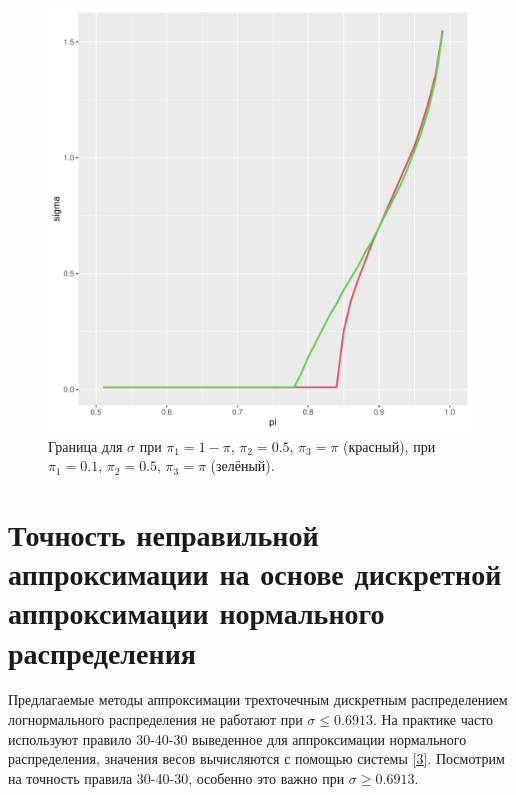 \documentclass[specialist, substylefile = spbu.rtx,
subf,href,colorlinks=true, 12pt]{disser}
\begin{document}
	\begin{figure}[!hhh]
		\begin{center}
			\begin{minipage}[h]{0.95\linewidth}
				\includegraphics[width=1\linewidth]{img/sigma_12_new.pdf}
				\caption{Граница для $\sigma$ при $\pi_{1} = 1-\pi$, $\pi_{2} = 0.5$, $\pi_{3} = \pi$ (красный), при $\pi_{1} = 0.1$, $\pi_{2} = 0.5$, $\pi_{3} = \pi$ (зелёный). } %
				\label{ris_sig12} %
			\end{minipage}
		\end{center}
	\end{figure}
	
	
	\section{Точность неправильной аппроксимации на основе дискретной аппроксимации нормального распределения}
	
	Предлагаемые методы аппроксимации трехточечным дискретным распределением логнормального распределения не работают при $\sigma \leq 0.6913$. На практике часто используют правило 30-40-30 выведенное для аппроксимации нормального распределения, значения весов вычисляются с помощью системы \eqref{3}. Посмотрим на точность правила 30-40-30, особенно это важно при $\sigma \geq 0.6913$.
	
\end{document}
